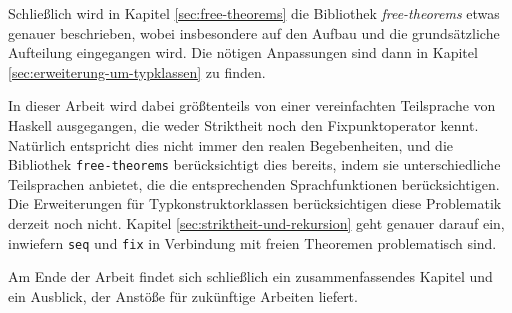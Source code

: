 


Schließlich wird in Kapitel \ref{sec:free-theorems} die Bibliothek \textit{free-theorems} etwas genauer beschrieben, wobei
insbesondere auf den Aufbau und die grundsätzliche Aufteilung eingegangen wird. Die nötigen Anpassungen sind dann in
Kapitel \ref{sec:erweiterung-um-typklassen} zu finden.

In dieser Arbeit wird dabei größtenteils von einer vereinfachten Teilsprache von Haskell ausgegangen, die weder Striktheit noch
den Fixpunktoperator kennt. Natürlich entspricht dies nicht immer den realen Begebenheiten, und die Bibliothek
\texttt{free-theorems} berücksichtigt dies bereits, indem sie unterschiedliche Teilsprachen anbietet, die die entsprechenden
Sprachfunktionen berücksichtigen. Die Erweiterungen für Typkonstruktorklassen berücksichtigen diese Problematik derzeit noch
nicht. Kapitel \ref{sec:striktheit-und-rekursion} geht genauer darauf ein, inwiefern \texttt{seq} und \texttt{fix} in Verbindung
mit freien Theoremen problematisch sind.

Am Ende der Arbeit findet sich schließlich ein zusammenfassendes Kapitel und ein Ausblick, der Anstöße für zukünftige Arbeiten
liefert.

